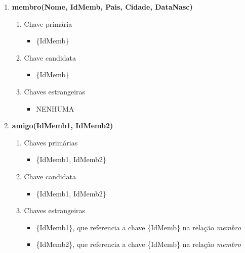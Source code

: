 \documentclass {report}
\begin{document}
\begin{enumerate}[label=-]

    \item \textbf{membro(Nome, IdMemb, Pais, Cidade, DataNasc)}
    \begin{enumerate}[label=\arabic*.]
        \item Chave primária
            \begin{itemize}
                \item \{IdMemb\}
            \end{itemize}
        \item Chave candidata
            \begin{itemize}
                \item \{IdMemb\}
            \end{itemize}
        \item Chaves estrangeiras
            \begin{itemize}
                \item NENHUMA
            \end{itemize}
    \end{enumerate}
    
    \item \textbf{amigo(IdMemb1, IdMemb2)}
    \begin{enumerate}[label=\arabic*.]
        \item Chaves primárias
            \begin{itemize}
                \item \{IdMemb1, IdMemb2\}
            \end{itemize}
        \item Chave candidata
            \begin{itemize}
                \item \{IdMemb1, IdMemb2\}
            \end{itemize}
        \item Chaves estrangeiras
            \begin{itemize}
                \item \{IdMemb1\}, que referencia a chave \{IdMemb\} na relação \textit{membro}
                \item \{IdMemb2\}, que referencia a chave \{IdMemb\} na relação \textit{membro}
            \end{itemize}
    \end{enumerate}
    

\end{enumerate}
\end{document}
